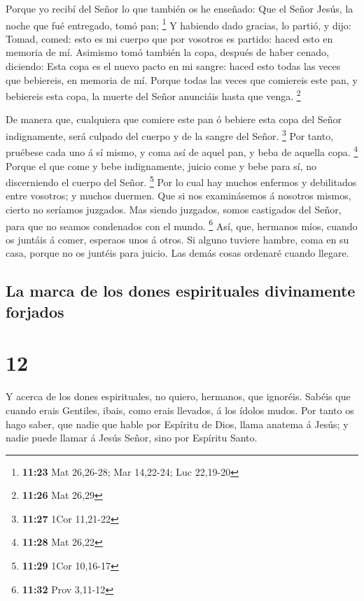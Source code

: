  Porque yo recibí del Señor lo que también os he
enseñado: Que el Señor Jesús, la noche que fué entregado, tomó pan;
\footnote{\textbf{11:23} Mat 26,26-28; Mar 14,22-24; Luc 22,19-20}
 Y habiendo dado gracias, lo partió, y dijo: Tomad,
comed: esto es mi cuerpo que por vosotros es partido: haced esto en
memoria de mí.  Asimismo tomó también la copa, después de
haber cenado, diciendo: Esta copa es el nuevo pacto en mi sangre: haced
esto todas las veces que bebiereis, en memoria de mí. 
Porque todas las veces que comiereis este pan, y bebiereis esta copa, la
muerte del Señor anunciáis hasta que venga. \footnote{\textbf{11:26} Mat
  26,29}

 De manera que, cualquiera que comiere este pan ó bebiere
esta copa del Señor indignamente, será culpado del cuerpo y de la sangre
del Señor. \footnote{\textbf{11:27} 1Cor 11,21-22}  Por
tanto, pruébese cada uno á sí mismo, y coma así de aquel pan, y beba de
aquella copa. \footnote{\textbf{11:28} Mat 26,22}  Porque
el que come y bebe indignamente, juicio come y bebe para sí, no
discerniendo el cuerpo del Señor. \footnote{\textbf{11:29} 1Cor 10,16-17}
 Por lo cual hay muchos enfermos y debilitados entre
vosotros; y muchos duermen.  Que si nos examinásemos á
nosotros mismos, cierto no seríamos juzgados.  Mas siendo
juzgados, somos castigados del Señor, para que no seamos condenados con
el mundo. \footnote{\textbf{11:32} Prov 3,11-12}  Así,
que, hermanos míos, cuando os juntáis á comer, esperaos unos á otros.
 Si alguno tuviere hambre, coma en su casa, porque no os
juntéis para juicio. Las demás cosas ordenaré cuando llegare.

\hypertarget{la-marca-de-los-dones-espirituales-divinamente-forjados}{%
\subsection{La marca de los dones espirituales divinamente
forjados}\label{la-marca-de-los-dones-espirituales-divinamente-forjados}}

\hypertarget{section-11}{%
\section{12}\label{section-11}}

 Y acerca de los dones espirituales, no quiero, hermanos,
que ignoréis.  Sabéis que cuando erais Gentiles, ibais,
como erais llevados, á los ídolos mudos.  Por tanto os
hago saber, que nadie que hable por Espíritu de Dios, llama anatema á
Jesús; y nadie puede llamar á Jesús Señor, sino por Espíritu Santo.

